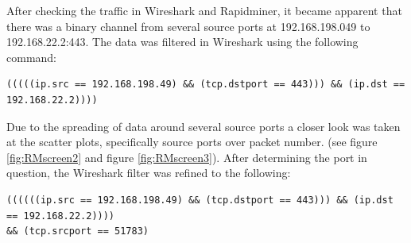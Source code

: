 \documentclass{article}
\begin{document}
After checking the traffic in Wireshark and Rapidminer, it became apparent that there was a binary channel from several source ports at 192.168.198.049 to 192.168.22.2:443. The data was filtered in Wireshark using the following command:
\begin{verbatim}
(((((ip.src == 192.168.198.49) && (tcp.dstport == 443))) && (ip.dst == 192.168.22.2))))
\end{verbatim}

Due to the spreading of data around several source ports a closer look was taken at the scatter plots, specifically source ports over packet number. (see figure \ref{fig:RMscreen2} and figure \ref{fig:RMscreen3}). After determining the port in question, the Wireshark filter was refined to the following:
\begin{verbatim}
((((((ip.src == 192.168.198.49) && (tcp.dstport == 443))) && (ip.dst == 192.168.22.2)))) 
&& (tcp.srcport == 51783)
\end{verbatim}
\end{document}
